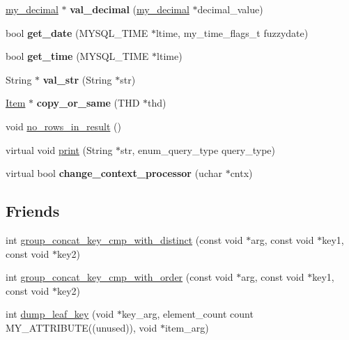 \begin{DoxyCompactItemize}
\mbox{\hyperlink{classmy__decimal}{my\+\_\+decimal}} $\ast$ {\bfseries val\+\_\+decimal} (\mbox{\hyperlink{classmy__decimal}{my\+\_\+decimal}} $\ast$decimal\+\_\+value)
\item 
\mbox{\label{classItem__func__group__concat_a4abd971ec3fa8407ce1618673c3468fd}} 
bool {\bfseries get\+\_\+date} (M\+Y\+S\+Q\+L\+\_\+\+T\+I\+ME $\ast$ltime, my\+\_\+time\+\_\+flags\+\_\+t fuzzydate)
\item 
\mbox{\label{classItem__func__group__concat_a7dcf799116c2b8edb07f7244292a4224}} 
bool {\bfseries get\+\_\+time} (M\+Y\+S\+Q\+L\+\_\+\+T\+I\+ME $\ast$ltime)
\item 
\mbox{\label{classItem__func__group__concat_a419b0c8fc67516d03e865c80450969ea}} 
String $\ast$ {\bfseries val\+\_\+str} (String $\ast$str)
\item 
\mbox{\label{classItem__func__group__concat_aedcf518fcb76c17258e7939b6ffd4523}} 
\mbox{\hyperlink{classItem}{Item}} $\ast$ {\bfseries copy\+\_\+or\+\_\+same} (T\+HD $\ast$thd)
\item 
void \mbox{\hyperlink{classItem__func__group__concat_a89dcd722bccaa2c1b16d972ce823087f}{no\+\_\+rows\+\_\+in\+\_\+result}} ()
\item 
virtual void \mbox{\hyperlink{classItem__func__group__concat_aec51f14b9c22c61d5ac4e58add30365b}{print}} (String $\ast$str, enum\+\_\+query\+\_\+type query\+\_\+type)
\item 
\mbox{\label{classItem__func__group__concat_a81da42c70835ee6e78054adc3c9f9b18}} 
virtual bool {\bfseries change\+\_\+context\+\_\+processor} (uchar $\ast$cntx)
\end{DoxyCompactItemize}
\subsection*{Friends}
\begin{DoxyCompactItemize}
\item 
int \mbox{\hyperlink{classItem__func__group__concat_a472c419ab553899eb8a8f2645f4c55be}{group\+\_\+concat\+\_\+key\+\_\+cmp\+\_\+with\+\_\+distinct}} (const void $\ast$arg, const void $\ast$key1, const void $\ast$key2)
\item 
int \mbox{\hyperlink{classItem__func__group__concat_a53a52a3ef588f2b7cfd0a612b6d374da}{group\+\_\+concat\+\_\+key\+\_\+cmp\+\_\+with\+\_\+order}} (const void $\ast$arg, const void $\ast$key1, const void $\ast$key2)
\item 
int \mbox{\hyperlink{classItem__func__group__concat_a3fff8ed469149feebd57688fa152c429}{dump\+\_\+leaf\+\_\+key}} (void $\ast$key\+\_\+arg, element\+\_\+count count M\+Y\+\_\+\+A\+T\+T\+R\+I\+B\+U\+TE((unused)), void $\ast$item\+\_\+arg)
\end{DoxyCompactItemize}
